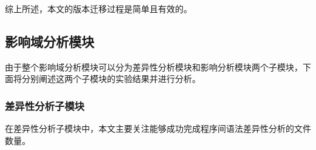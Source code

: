 综上所述，本文的版本迁移过程是简单且有效的。

%
%

\subsection{影响域分析模块}

由于整个影响域分析模块可以分为差异性分析模块和影响分析模块两个子模块，下面将分别阐述这两个子模块的实验结果并进行分析。

\subsubsection{差异性分析子模块}

在差异性分析子模块中，本文主要关注能够成功完成程序间语法差异性分析的文件数量。

